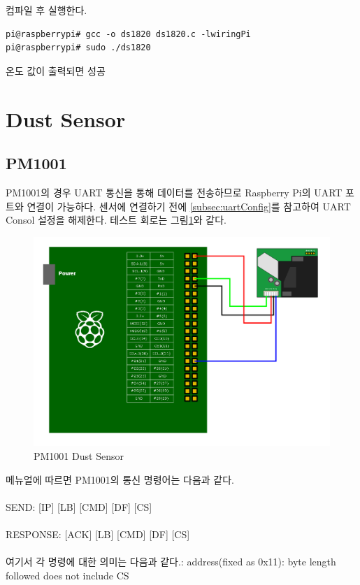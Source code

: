 \documentclass[11pt
  , a4paper
  , article
  , oneside
]{memoir}
\begin{document}
컴파일 후 실행한다.
\begin{lstlisting}[style=termstyle]
pi@raspberrypi# gcc -o ds1820 ds1820.c -lwiringPi
pi@raspberrypi# sudo ./ds1820
\end{lstlisting}
온도 값이 출력되면 성공
\section{Dust Sensor}
\subsection{PM1001}\label{subsec:pm1001Test}
PM1001의 경우 UART 통신을 통해 데이터를 전송하므로 Raspberry Pi의 UART 포트와 연결이 가능하다.
센서에 연결하기 전에 \ref{subsec:uartConfig}를 참고하여 UART Consol 설정을 해제한다.
테스트 회로는 그림\ref{fig:pm1001_test}와 같다.
\begin{figure}[!htb]
\centering
\includegraphics[width=1\textwidth]{./images/epics/PM1001Test.png}
\caption{PM1001 Dust Sensor}
\label{fig:pm1001_test}
\end{figure}
메뉴얼에 따르면 PM1001의 통신 명령어는 다음과 같다.\\
\\
        SEND: [IP] [LB] [CMD] [DF] [CS]\\
\\
        RESPONSE: [ACK] [LB] [CMD] [DF] [CS]\\
\\
여기서 각 명령에 대한 의미는 다음과 같다.\newline
[IP]: address(fixed as 0x11)\newline
[LB]: byte length followed does not include CS\newline
\end{document}
